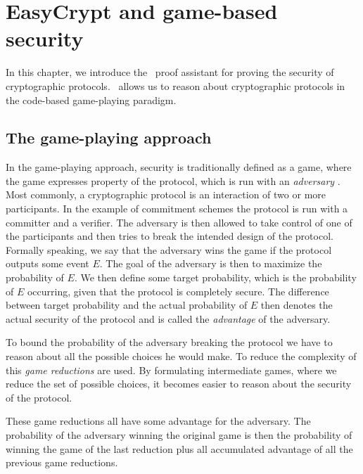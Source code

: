 \chapter{EasyCrypt and game-based security}
\label{ch:EasyCrypt}
In this chapter, we introduce the \easycrypt\ proof assistant for proving the security
of cryptographic protocols. \easycrypt\ allows us to reason about cryptographic
protocols in the code-based game-playing paradigm.

\section{The game-playing approach}
\label{sec:game-based-sec}
In the game-playing approach, security is traditionally defined as a game, where
the game expresses property of the protocol, which is run with an
\textit{adversary} \cite{game-playing}. Most commonly, a cryptographic protocol
is an interaction of two or more participants. In the example of commitment schemes
the protocol is run with a committer and a verifier. The adversary is then
allowed to take control of one of the participants and then tries to break the
intended design of the protocol.
Formally speaking, we say that the adversary
wins the game if the protocol outputs some event $E$. The goal of the adversary
is then to maximize the probability of $E$.
We then define some target probability, which is the probability of $E$
occurring, given that the protocol is completely secure. The difference between
target probability and the actual probability of $E$ then denotes the actual
security of the protocol and is called the \textit{advantage} of the adversary.

To bound the probability of the adversary breaking the protocol we have to
reason about all the possible choices he would make. To reduce the complexity of
this \textit{game reductions} are used. By formulating intermediate games, where
we reduce the set of possible choices, it becomes easier to reason
about the security of the protocol.

These game reductions all have some advantage for the adversary. The probability
of the adversary winning the original game is then the probability of winning
the game of the last reduction plus all accumulated advantage of all the
previous game reductions.

